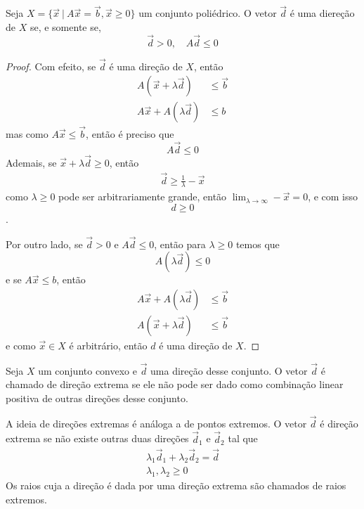 \begin{prop:direção}
	Seja $X = \{\vec{x}\ |\ A\vec{x} = \vec{b}, \vec{x} \geq 0\}$ um conjunto poliédrico. O vetor $\vec{d}$ é uma diereção de $X$ se, e somente se,
	\begin{equation*}
		\vec{d} > 0, \quad A\vec{d} \leq 0
	\end{equation*}

	\begin{proof}
		Com efeito, se $\vec{d}$ é uma direção de $X$, então
		\begin{align*}
			A (\vec{x} + \lambda \vec{d}) &\leq \vec{b} \\
			A \vec{x} + A (\lambda \vec{d}) & \leq b
		\end{align*}
		mas como $A \vec{x} \leq \vec{b}$, então é preciso que
		\begin{equation*}
			A\vec{d} \leq 0
		\end{equation*}
		Ademais, se $\vec{x} + \lambda \vec{d} \geq 0$, então
		\begin{align}
			\vec{d} \geq \frac{1}{\lambda} -\vec{x}
		\end{align}
		como $\lambda \geq 0$ pode ser arbitrariamente grande, então
		$\lim_{\lambda \to \infty} -\vec{x} = 0$, e com isso
		\[d \geq 0\].

		Por outro lado, se $\vec{d} > 0$ e $A \vec{d} \leq 0$, então para $\lambda \geq 0$ temos que
		\[A (\lambda \vec{d}) \leq 0\]
		e se $A \vec{x} \leq b$, então
		\begin{align*}
			A \vec{x} + A (\lambda \vec{d}) &\leq \vec{b} \\
			A (\vec{x} + \lambda \vec{d}) &\leq \vec{b}
		\end{align*}
		e como $\vec{x} \in X$ é arbitrário, então $d$ é uma direção de $X$.
	\end{proof}
\end{prop:direção}

\begin{def:direção extrema}
	Seja $X$ um conjunto convexo e $\vec{d}$ uma direção desse conjunto. O vetor $\vec{d}$ é chamado de direção extrema se ele não pode ser dado como combinação linear positiva de outras direções desse conjunto.
\end{def:direção extrema}

A ideia de direções extremas é análoga a de pontos extremos. O vetor $\vec{d}$ é direção extrema se não existe outras duas direções $\vec{d}_1$ e $\vec{d}_2$ tal que
\begin{gather*}
	\lambda_1\vec{d}_1 + \lambda_2\vec{d}_2 = \vec{d} \\
	\lambda_1, \lambda_2 \geq 0
\end{gather*}
Os raios cuja a direção é dada por uma direção extrema são chamados de raios extremos.


